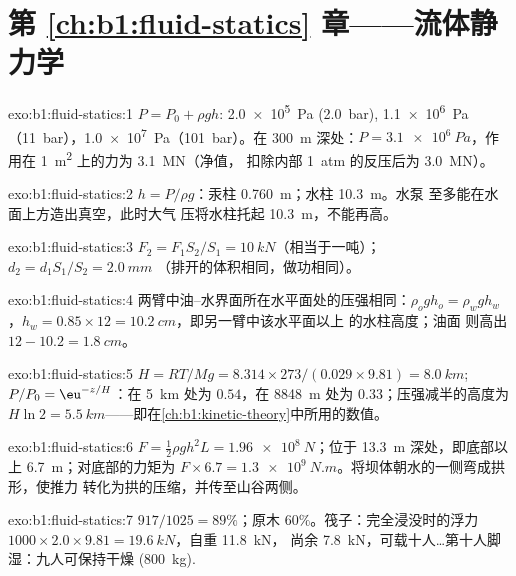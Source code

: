 \section*{第 \ref{ch:b1:fluid-statics} 章——流体静力学}

\begin{solution}{exo:b1:fluid-statics:1}
$P = P_0 + \rho gh$: \qty{2.0e5}{Pa} (\qty{2.0}{bar}), \qty{1.1e6}{Pa}
（\qty{11}{bar}），\qty{1.0e7}{Pa}（\qty{101}{bar}）。在 \qty{300}{m} 深处：$P =
\qty{3.1e6}{Pa}$，作用在 \qty{1}{m^2} 上的力为 \qty{3.1}{MN}（净值，
扣除内部 \qty{1}{atm} 的反压后为 \qty{3.0}{MN}）。
\end{solution}

\begin{solution}{exo:b1:fluid-statics:2}
$h = P/\rho g$：汞柱 \qty{0.760}{m}；水柱 \qty{10.3}{m}。水泵
至多能在水面上方造出真空，此时大气
压将水柱托起 \qty{10.3}{m}，不能再高。
\end{solution}

\begin{solution}{exo:b1:fluid-statics:3}
$F_2 = F_1S_2/S_1 = \qty{10}{kN}$（相当于一吨）；$d_2 = d_1S_1/S_2 = \qty{2.0}{mm}$
（排开的体积相同，做功相同）。
\end{solution}

\begin{solution}{exo:b1:fluid-statics:4}
两臂中油–水界面所在水平面处的压强相同：$\rho_og
h_o = \rho_wgh_w$，$h_w = 0.85 \times 12 = \qty{10.2}{cm}$，即另一臂中该水平面以上
的水柱高度；油面
则高出 $12 - 10.2 = \qty{1.8}{cm}$。
\end{solution}

\begin{solution}{exo:b1:fluid-statics:5}
$H = RT/Mg = 8.314 \times 273/(0.029 \times 9.81) = \qty{8.0}{km}$; $P/P_0 =
\eu^{-z/H}$：在 \qty{5}{km} 处为 $0.54$，在 \qty{8848}{m} 处为 $0.33$；压强减半的高度为 $H\ln2 =
\qty{5.5}{km}$——即在\cref{ch:b1:kinetic-theory}中所用的数值。
\end{solution}

\begin{solution}{exo:b1:fluid-statics:6}
$F = \tfrac12\rho gh^2L = \qty{1.96e8}{N}$；位于 \qty{13.3}{m}
深处，即底部以上 \qty{6.7}{m}；对底部的力矩为 $F \times
6.7 = \qty{1.3e9}{N.m}$。将坝体朝水的一侧弯成拱形，使推力
转化为拱的压缩，并传至山谷两侧。
\end{solution}

\begin{solution}{exo:b1:fluid-statics:7}
$917/1025 = 89\%$；原木 $60\%$。筏子：完全浸没时的浮力 $1000 \times
2.0 \times 9.81 = \qty{19.6}{kN}$，自重 \qty{11.8}{kN}，
尚余 \qty{7.8}{kN}，可载十人\dots{}第十人脚湿：九人可保持干燥
(\qty{800}{kg}).
\end{solution}

